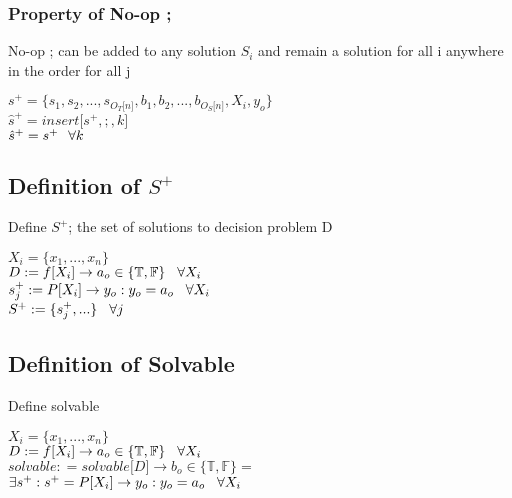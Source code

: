 \documentclass[11pt]{article}
\begin{document}
\subsubsection{Property of No-op ;}
No-op ; can be added to any solution $S_i$ and remain a solution for all i anywhere in the order for all j
\begin{center}
$
s^+ = \{ s_1,s_2,...,s_{O_T \lbrack n \rbrack }, b_1, b_2,...,b_{O_S \lbrack n \rbrack},X_i,y_o\}
$
\\ \vspace{2mm}
$
\hat{s}^+ = insert \lbrack s^+,;,k \rbrack
$
\\ \vspace{2mm}
$
\hat{s}^+ = s^+ \hspace{2.5mm} \forall k
$
\end{center}





\subsection{Definition of $S^+$}
Define $S^+$; the set of solutions to decision problem D
\begin{center}
$
X_i = \{x_1,...,x_n\}
$
\\ \vspace{2mm}
$
D := f \lbrack X_i \rbrack \rightarrow a_{o} \in \{\mathbb{T}, \mathbb{F}\} \hspace{3mm} \forall X_i
$
\\ \vspace{2mm}
$
s_j^+ := P \lbrack X_i \rbrack \rightarrow y_{o} : y_o = a_{o} \hspace{3mm} \forall X_i
$
\\ \vspace{2mm}
$
S^+ := \{s^+_j,...\} \hspace{3mm} \forall j
$
\end{center}





\subsection{Definition of Solvable}
Define solvable
\begin{center}
$
X_i = \{x_1,...,x_n\}
$
\\ \vspace{2mm}
$
D := f \lbrack X_i \rbrack \rightarrow a_{o} \in \{\mathbb{T}, \mathbb{F}\} \hspace{3mm} \forall X_i
$
\\ \vspace{2mm}
$solvable : = solvable \lbrack D \rbrack \rightarrow b_o \in \{ \mathbb{T}, \mathbb{F} \} =$
\\ \vspace{2mm}
$\exists s^+ : s^+ = P \lbrack X_i \rbrack \rightarrow y_{o} : y_o = a_{o} \hspace{3mm} \forall X_i$
\end{center}
\end{document}
